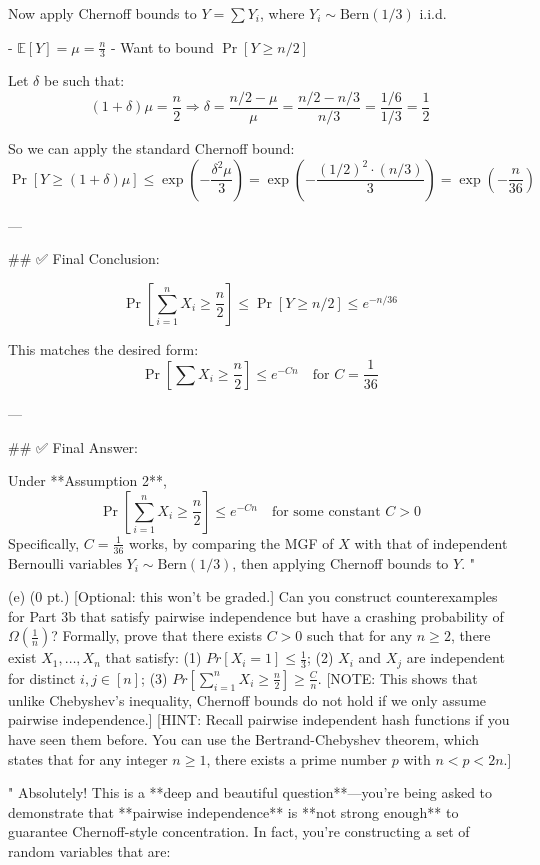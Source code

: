 Now apply Chernoff bounds to \( Y = \sum Y_i \), where \( Y_i \sim \text{Bern}(1/3) \) i.i.d.

- \( \mathbb{E}[Y] = \mu = \frac{n}{3} \)
- Want to bound \( \Pr[Y \ge n/2] \)

Let \( \delta \) be such that:
\[
(1 + \delta)\mu = \frac{n}{2} \Rightarrow \delta = \frac{n/2 - \mu}{\mu} = \frac{n/2 - n/3}{n/3} = \frac{1/6}{1/3} = \frac{1}{2}
\]

So we can apply the standard Chernoff bound:
\[
\Pr[Y \ge (1 + \delta)\mu] \le \exp\left(-\frac{\delta^2 \mu}{3} \right)
= \exp\left( -\frac{(1/2)^2 \cdot (n/3)}{3} \right)
= \exp\left(-\frac{n}{36} \right)
\]

---

## ✅ Final Conclusion:

\[
\Pr\left[ \sum_{i=1}^n X_i \ge \frac{n}{2} \right] \le \Pr[Y \ge n/2] \le e^{-n/36}
\]

This matches the desired form:
\[
\Pr\left[\sum X_i \ge \frac{n}{2}\right] \le e^{-C n}
\quad \text{for } C = \frac{1}{36}
\]

---

## ✅ Final Answer:

Under **Assumption 2**,  
\[
\Pr\left[\sum_{i=1}^n X_i \ge \frac{n}{2} \right] \le e^{-C n}
\quad \text{for some constant } C > 0
\]
Specifically, \( C = \frac{1}{36} \) works, by comparing the MGF of \( X \) with that of independent Bernoulli variables \( Y_i \sim \text{Bern}(1/3) \), then applying Chernoff bounds to \( Y \).
"

(e) (0 pt.) [Optional: this won't be graded.] Can you construct counterexamples for Part 3b that satisfy pairwise independence but have a crashing probability of $\Omega(\frac{1}{n})$? Formally, prove that there exists $C > 0$ such that for any $n \ge 2$, there exist $X_1, \dots, X_n$ that satisfy: (1) $Pr	[X_i = 1] \le \frac{1}{3}$; (2) $X_i$ and $X_j$ are independent for distinct $i, j ∈ [n]$; (3) $Pr [\sum_{i=1}^n X_i \ge \frac{n}{2}] \ge \frac{C}{n}$.
[NOTE: This shows that unlike Chebyshev's inequality, Chernoff bounds do not hold if we only assume pairwise independence.]
[HINT: Recall pairwise independent hash functions if you have seen them before. You can use the Bertrand-Chebyshev theorem, which states that for any integer $n \ge 1$, there exists a prime number $p$ with $n < p < 2n$.]

"
Absolutely! This is a **deep and beautiful question**—you're being asked to demonstrate that **pairwise independence** is **not strong enough** to guarantee Chernoff-style concentration. In fact, you're constructing a set of random variables that are:


